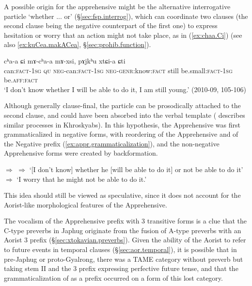A possible origin for the apprehensive  might be the alternative interrogative particle  `whether ... or' (§\ref{sec:fsp.interrog}), which can coordinate two clauses (the second clause being the negative counterpart of the first one) to express hesitation or worry that an action might not take place, as in (\ref{ex:chaa.Ci}) (see also  \ref{ex:kuCea.makACea}, §\ref{sec:prohib.function}).
 
 \begin{exe}
\ex \label{ex:chaa.Ci}
\gll  cʰa-a ɕi mɤ-cʰa-a mɤ-xsi, pɤjkʰu xtɕi-a ɕti \\
can:\textsc{fact}-\textsc{1sg} \textsc{qu} \textsc{neg}-can:\textsc{fact}-\textsc{1sg} \textsc{neg}-\textsc{genr}:know:\textsc{fact} still be.small:\textsc{fact}-\textsc{1sg} be.\textsc{aff}:\textsc{fact} \\
\glt `I don't know whether I will be able to do it, I am still young.' (2010-09, 105-106)
\end{exe}
  
Although generally clause-final, the particle    can be prosodically attached to the second clause, and could have been absorbed into the verbal template (\citealt{laiyf20betrayal} describes similar processes in Khroskyabs). In this hypothesis, the Apprehensive was first grammaticalized in negative forms, with reordering of the Apprehensive and of the Negative prefix (\ref{ex:appr.grammaticalization}), and the non-negative Apprehensive forms were created by backformation.

 \begin{exe}
\ex \label{ex:appr.grammaticalization}
\glt {} $\Rightarrow$  $\Rightarrow$  
\glt `[I don't know] whether he [will be able to do it] or not be able to do it' $\Rightarrow$ `I worry that he might not be able to do it.' 
\end{exe}

This idea should still be viewed as speculative, since it does not account for the Aorist-like morphological features of the Apprehensive. 

The  vocalism of the Apprehensive prefix with 3\flobv{} transitive forms is a clue that the C-type preverbs in Japhug originate from the fusion of A-type  preverbs with an Aorist 3\flobv{}  prefix (§\ref{sec:xtokavian.preverbs}). Given the ability of the Aorist to refer to future events in temporal clauses (§\ref{sec:aor.temporal}), it is possible that in pre-Japhug or proto-Gyalrong, there was a TAME category without preverb but taking stem II and the 3\flobv{}  prefix expressing perfective future tense, and that the grammaticalization of  as a prefix occurred on a form of this lost category.

